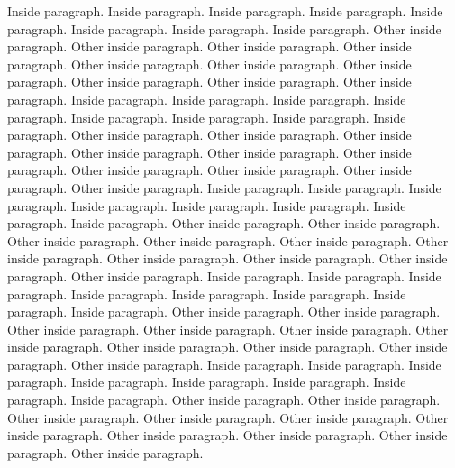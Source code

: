 \documentclass{scrartcl}
\begin{document}
\begin{pairs}
\begin{Leftside}
            \pend
                        \pstart
                Inside paragraph. Inside paragraph. Inside paragraph. Inside paragraph. Inside paragraph. Inside paragraph. Inside paragraph. Inside paragraph.
            \pend
            \pstart
                Other inside paragraph.  Other inside paragraph.  Other inside paragraph.  Other inside paragraph.  Other inside paragraph.  Other inside paragraph.  Other inside paragraph.  Other inside paragraph.  Other inside paragraph.  Other inside paragraph.
            \pend
                        \pstart
                Inside paragraph. Inside paragraph. Inside paragraph. Inside paragraph. Inside paragraph. Inside paragraph. Inside paragraph. Inside paragraph.
            \pend
            \pstart
                Other inside paragraph.  Other inside paragraph.  Other inside paragraph.  Other inside paragraph.  Other inside paragraph.  Other inside paragraph.  Other inside paragraph.  Other inside paragraph.  Other inside paragraph.  Other inside paragraph.
            \pend
                        \pstart
                Inside paragraph. Inside paragraph. Inside paragraph. Inside paragraph. Inside paragraph. Inside paragraph. Inside paragraph. Inside paragraph.
            \pend
            \pstart
                Other inside paragraph.  Other inside paragraph.  Other inside paragraph.  Other inside paragraph.  Other inside paragraph.  Other inside paragraph.  Other inside paragraph.  Other inside paragraph.  Other inside paragraph.  Other inside paragraph.
            \pend
                        \pstart
                Inside paragraph. Inside paragraph. Inside paragraph. Inside paragraph. Inside paragraph. Inside paragraph. Inside paragraph. Inside paragraph.
            \pend
            \pstart
                Other inside paragraph.  Other inside paragraph.  Other inside paragraph.  Other inside paragraph.  Other inside paragraph.  Other inside paragraph.  Other inside paragraph.  Other inside paragraph.  Other inside paragraph.  Other inside paragraph.
            \pend
                        \pstart
                Inside paragraph. Inside paragraph. Inside paragraph. Inside paragraph. Inside paragraph. Inside paragraph. Inside paragraph. Inside paragraph.
            \pend
            \pstart
                Other inside paragraph.  Other inside paragraph.  Other inside paragraph.  Other inside paragraph.  Other inside paragraph.  Other inside paragraph.  Other inside paragraph.  Other inside paragraph.  Other inside paragraph.  Other inside paragraph.
            \pend
                        \pstart

\end{Leftside}
\end{pairs}
\end{document}
